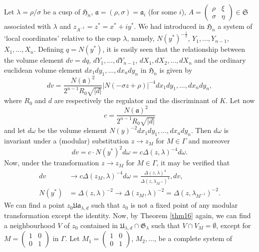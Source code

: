 Let $\lambda=\rho/\sigma$ be a cusp of $\mathfrak{H}_{n}$,
$\mathfrak{a}=(\rho,\sigma)=\mathfrak{a}_{i}$ (for some $i$),
$A=\left(\begin{smallmatrix} \rho & \xi\\ \sigma & \eta
\end{smallmatrix}\right)\in\mathfrak{S}$ associated with $\lambda$ and
$z_{A^{-1}}=z^{\ast}=x^{\ast}+iy^{\ast}$. We had introduced in
$\mathfrak{H}_{n}$ a system of `local coordinates' relative to the
cusp $\lambda$, namely, $N(y^{\ast})^{-\frac{1}{2}}$,
$Y_{1},\ldots,Y_{n-1}$, $X_{1},\ldots,X_{n}$. Defining
$q=N(y^{\ast})$, it is easily seen that the relationship between the
volume element $dv=dq$, $dY_{1},\ldots,dY_{n-1}$,
$dX_{1},dX_{2},\ldots,dX_{n}$ and the ordinary euclidean volume
element $dx_{1}dy_{1},\ldots,dx_{n}dy_{n}$ in $\mathfrak{H}_{n}$ is
given by
$$
dv=\frac{N(\mathfrak{a})^{2}}{2^{n-1}R_{0}\sqrt{|d|}}|N(-\sigma
z+\rho)|^{-4}dx_{1}dy_{1},\ldots,dx_{n}dy_{n}, 
$$
where $R_{0}$ and $d$ are respectively the regulator and the
discriminant of $K$. Let now
$$
c=\frac{N(\mathfrak{a})^{2}}{2^{n-1}R_{0}\sqrt{|d|}}
$$
and let $d\omega$ be the volume element
$N(y)^{-2}dx_{1}dy_{1},\ldots,dx_{n}dy_{n}$. Then $d\omega$ is
invariant under a (modular) substitution $z\to z_{M}$ for $M\in\Gamma$
and moreover
$$
dv=c\cdot N(y^{\ast})^{2}d\omega=c\Delta(z,\lambda)^{-4}d\omega.
$$
Now, under the transformation $z\to z_{M}$ for $M\in\Gamma$, it may be
verified that
\begin{align*}
dv &\to
c\Delta(z_{M},\lambda)^{-4}d\omega=\frac{\Delta(z,\lambda)^{4}}{\Delta(z,\lambda_{M^{-1}})^{4}},
dv, \tag{169}\label{169}\\
N(y^{\ast}) &= \Delta(z,\lambda)^{-2}\to \Delta(z_{M},\lambda)^{-2}=\Delta(z,\lambda_{M^{-1}})^{-2}.
\end{align*}
We can find a point $z_{0}\mathfrak{U}\mathfrak{a}_{\lambda,d}$ such
that $z_{0}$ is not a fixed point of any modular\pageoriginale
transformation except the identity. Now, by Theorem \ref{thm16} again,
we can find a neighbourhood $V$ of $z_{0}$ contained in
$\mathfrak{U}_{\lambda,d}\cap \mathfrak{G}_{\lambda}$ such that $V\cap
V_{M}=\emptyset$, except for $M=\left(\begin{smallmatrix} 1 & 0\\ 0 &
  1\end{smallmatrix}\right)$ in $\Gamma$. Let
  $M_{1}=\left(\begin{smallmatrix} 1 & 0\\ 0 & 1
  \end{smallmatrix}\right)$, $M_{2},\ldots$, be a complete system of
